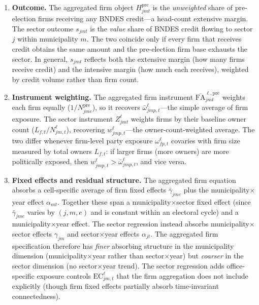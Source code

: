 \documentclass{article}
\newcommand{\FA}{\mathrm{FA}}
\newcommand{\EC}{\mathrm{EC}}
\begin{document}
\begin{enumerate}[leftmargin=*]
\item \textbf{Outcome.}
  The aggregated firm object $H^{\mathrm{pre}}_{jmt}$ is the
  \emph{unweighted} share of pre-election firms receiving any BNDES credit---a
  head-count extensive margin.
  The sector outcome $s_{jmt}$ is the \emph{value} share of BNDES credit
  flowing to sector $j$ within municipality $m$.
  The two coincide only if every firm that receives credit obtains the same
  amount and the pre-election firm base exhausts the sector.
  In general, $s_{jmt}$ reflects both the extensive margin (how many firms
  receive credit) and the intensive margin (how much each receives), weighted
  by credit volume rather than firm count.

\item \textbf{Instrument weighting.}
  The aggregated firm instrument $\overline{\FA}^{\ell,\mathrm{pre}}_{jmt}$
  weights each firm equally ($1/N^{\mathrm{pre}}_{jme}$), so it recovers
  $\bar{\omega}^\ell_{jmp,t}$---the simple average of firm exposure.
  The sector instrument $Z^{\ell}_{jmt}$ weights firms by their baseline
  owner count ($L_{f,t}/N^\ell_{jm,t}$), recovering
  $w^\ell_{jmp,t}$---the owner-count-weighted average.
  The two differ whenever firm-level party exposure
  $\omega^\ell_{fp,t}$ covaries with firm size measured by total owners
  $L_{f,t}$: if larger firms (more owners) are more politically exposed,
  then $w^\ell_{jmp,t} > \bar{\omega}^\ell_{jmp,t}$, and vice versa.

\item \textbf{Fixed effects and residual structure.}
  The aggregated firm equation absorbs a cell-specific average of firm fixed
  effects $\bar{\gamma}_{jme}$ plus the municipality$\times$year effect
  $\alpha_{mt}$.
  Together these span a municipality$\times$sector fixed effect (since
  $\bar{\gamma}_{jme}$ varies by $(j,m,e)$ and is constant within an
  electoral cycle) and a municipality$\times$year effect.
  The sector regression instead absorbs municipality$\times$sector effects
  $\gamma_{jm}$ and sector$\times$year effects $\alpha_{jt}$.
  The aggregated firm specification therefore has \emph{finer} absorbing
  structure in the municipality dimension (municipality$\times$year rather
  than sector$\times$year) but \emph{coarser} in the sector dimension (no
  sector$\times$year trend).
  The sector regression adds office-specific exposure controls $\EC^\ell_{jm,t}$ that the
  firm aggregation does not include explicitly (though firm fixed effects
  partially absorb time-invariant connectedness).
\end{enumerate}
\end{document}

